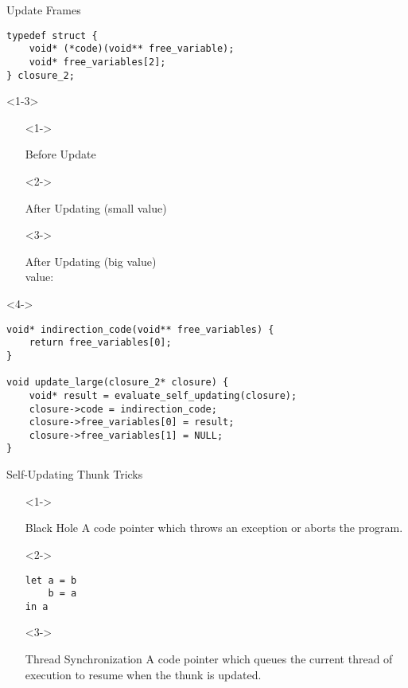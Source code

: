 \documentclass{beamer}
\begin{document}
\begin{frame}[fragile]{Update Frames}
  \begin{verbatim}
typedef struct {
    void* (*code)(void** free_variable);
    void* free_variables[2];
} closure_2;
  \end{verbatim}

  \begin{onlyenv}<1-3>
    \begin{itemize}
    \item[]<1-> \begin{block}{Before Update}
        \texttt{}
      \end{block}
    \item[]<2-> \begin{block}{After Updating (small value)}
        \texttt{}
      \end{block}
    \item[]<3-> \begin{block}{After Updating (big value)}
        \texttt{} \\
        value: \texttt{}
      \end{block}
    \end{itemize}
  \end{onlyenv}

  \begin{onlyenv}<4->
    \begin{verbatim}
void* indirection_code(void** free_variables) {
    return free_variables[0];
}

void update_large(closure_2* closure) {
    void* result = evaluate_self_updating(closure);
    closure->code = indirection_code;
    closure->free_variables[0] = result;
    closure->free_variables[1] = NULL;
}
    \end{verbatim}
  \end{onlyenv}
\end{frame}

\begin{frame}[fragile]{Self-Updating Thunk Tricks}
  \begin{itemize}
  \item[]<1-> \begin{block}{Black Hole}
      A code pointer which throws an exception or aborts the program.
    \end{block}
  \item[]<2-> \begin{verbatim}
let a = b
    b = a
in a
    \end{verbatim}
  \item[]<3-> \begin{block}{Thread Synchronization}
      A code pointer which queues the current thread of execution to resume when
      the thunk is updated.
    \end{block}
  \end{itemize}
\end{frame}
\end{document}
